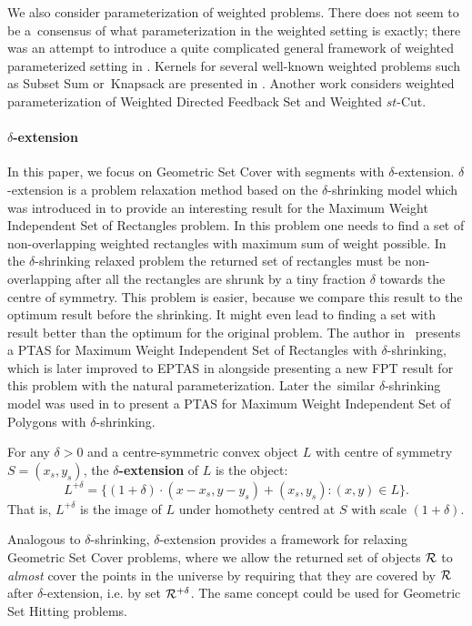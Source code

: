 We also consider parameterization of weighted problems.
There does not seem to be a~consensus of what parameterization
in the weighted setting is exactly; there
was an attempt to introduce a quite complicated general
framework of weighted parameterized setting in \cite{weighted_framework}.
Kernels for several well-known weighted problems
such as Subset Sum or~Knapsack are presented in \cite{kernel_weighted}.
Another work \cite{weighted_flow} considers weighted
parameterization of Weighted Directed Feedback Set and Weighted $st$-Cut.

\paragraph{$\delta$-extension}
In this paper, we focus on Geometric Set Cover with segments with $\delta$-extension.
$\delta$-extension is a problem relaxation method based on the
$\delta$-shrinking model which was introduced in \cite{shrinking_original}
to provide an interesting result for
the Maximum Weight Independent Set of Rectangles problem.
In this problem one needs to find a set of non-overlapping
weighted rectangles with maximum sum of weight possible.
In the $\delta$-shrinking relaxed problem
the returned set of rectangles must be non-overlapping
after all the rectangles are shrunk by a tiny fraction $\delta$
towards the centre of symmetry.
This problem is easier, because we compare this result
to the optimum result before the shrinking. It might
even lead to finding a set with result better than the optimum
for the original problem.
The author in~\cite{shrinking_original} presents a PTAS
for Maximum Weight Independent Set of Rectangles with $\delta$-shrinking,
which is later improved to EPTAS in \cite{shrinking1} alongside
presenting a new FPT result for this problem with the natural parameterization.
Later the~similar $\delta$-shrinking model was used in \cite{shrinking2}
to present a PTAS for
Maximum Weight Independent Set of Polygons with $\delta$-shrinking.

\begin{defi}
\label{definition:delta_extension}
For any $\delta > 0$ and a centre-symmetric convex object $L$ with
centre of symmetry $S = (x_s, y_s)$,
the \textbf{$\delta$-extension} of $L$ is the object:
$$L^{+\delta} = \{(1 + \delta)\cdot(x - x_s, y - y_s) + (x_s, y_s) : (x, y) \in L\}.$$
That is, $L^{+\delta}$ is the image of $L$ under homothety centred
at $S$ with scale $(1+\delta)$.
\end{defi}

Analogous to $\delta$-shrinking,
$\delta$-extension provides a framework for relaxing
Geometric Set Cover problems, where we allow the returned set of
objects $\mathcal{R}$ to \textit{almost} cover the points in the universe
by requiring that they are covered by $\mathcal{R}$ after $\delta$-extension,
i.e. by set $\mathcal{R}^{+\delta}$.
The same concept could be used for Geometric Set Hitting problems.
 
